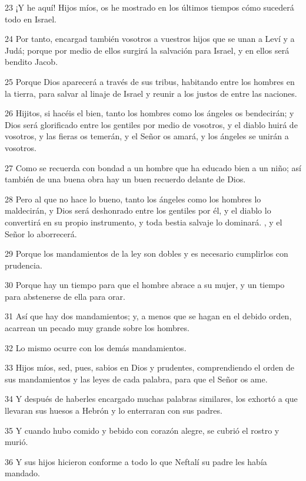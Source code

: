 \par 23 ¡Y he aquí! Hijos míos, os he mostrado en los últimos tiempos cómo sucederá todo en Israel.

\par 24 Por tanto, encargad también vosotros a vuestros hijos que se unan a Leví y a Judá; porque por medio de ellos surgirá la salvación para Israel, y en ellos será bendito Jacob.

\par 25 Porque Dios aparecerá a través de sus tribus, habitando entre los hombres en la tierra, para salvar al linaje de Israel y reunir a los justos de entre las naciones.

\par 26 Hijitos, si hacéis el bien, tanto los hombres como los ángeles os bendecirán; y Dios será glorificado entre los gentiles por medio de vosotros, y el diablo huirá de vosotros, y las fieras os temerán, y el Señor os amará, y los ángeles se unirán a vosotros.

\par 27 Como se recuerda con bondad a un hombre que ha educado bien a un niño; así también de una buena obra hay un buen recuerdo delante de Dios.

\par 28 Pero al que no hace lo bueno, tanto los ángeles como los hombres lo maldecirán, y Dios será deshonrado entre los gentiles por él, y el diablo lo convertirá en su propio instrumento, y toda bestia salvaje lo dominará. , y el Señor lo aborrecerá.

\par 29 Porque los mandamientos de la ley son dobles y es necesario cumplirlos con prudencia.

\par 30 Porque hay un tiempo para que el hombre abrace a su mujer, y un tiempo para abstenerse de ella para orar.

\par 31 Así que hay dos mandamientos; y, a menos que se hagan en el debido orden, acarrean un pecado muy grande sobre los hombres.

\par 32 Lo mismo ocurre con los demás mandamientos.

\par 33 Hijos míos, sed, pues, sabios en Dios y prudentes, comprendiendo el orden de sus mandamientos y las leyes de cada palabra, para que el Señor os ame.

\par 34 Y después de haberles encargado muchas palabras similares, los exhortó a que llevaran sus huesos a Hebrón y lo enterraran con sus padres.

\par 35 Y cuando hubo comido y bebido con corazón alegre, se cubrió el rostro y murió.

\par 36 Y sus hijos hicieron conforme a todo lo que Neftalí su padre les había mandado.



